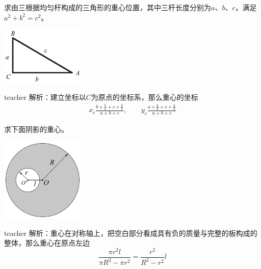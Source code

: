 \begin{example}

求由三根据均匀杆构成的三角形的重心位置，其中三杆长度分别为$a、b、c$，满足$a^2+b^2=c^2$。
\begin{flushright}
\includegraphics[width = 0.3\textwidth]{images/static-force-2.pdf} 
\end{flushright}
\begin{taggedblock}{teacher}
\vspace*{4cm}
\noindent
解析：建立坐标以$C$为原点的坐标系，那么重心的坐标
\begin{eqnarray*}
x_c\frac{b\times \frac{b}{2}+c\times\frac{b}{2}}{a+b+c},\qquad y_c  \frac{a\times \frac{a}{2}+c\times\frac{a}{2}}{a+b+c}
\end{eqnarray*}
\end{taggedblock}
\end{example}



\begin{example}

求下面阴影的重心。
\begin{flushright}
\includegraphics[width = 0.3\textwidth]{images/static-force-3.pdf} 
\end{flushright}
\begin{taggedblock}{teacher}
\noindent
解析：重心在对称轴上，把空白部分看成具有负的质量与完整的板构成的整体，那么重心在原点左边
\[
\frac{\pi r^2 l}{\pi R^2-\pi r^2} = \frac{r^2}{R^2-r^2}l
\]
\end{taggedblock}
\end{example}


